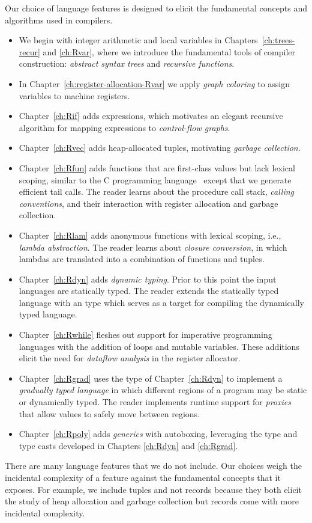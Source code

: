 \documentclass[7x10]{TimesAPriori_MIT}%
\begin{document}
Our choice of language features is designed to elicit the fundamental
concepts and algorithms used in compilers.
\begin{itemize}
\item We begin with integer arithmetic and local variables in
  Chapters~\ref{ch:trees-recur} and \ref{ch:Rvar}, where we introduce
  the fundamental tools of compiler construction: \emph{abstract
    syntax trees} and \emph{recursive functions}. 
\item In Chapter~\ref{ch:register-allocation-Rvar} we apply
  \emph{graph coloring} to assign variables to machine registers.
\item Chapter~\ref{ch:Rif} adds  expressions, which motivates
  an elegant recursive algorithm for mapping expressions to
  \emph{control-flow graphs}.
\item Chapter~\ref{ch:Rvec} adds heap-allocated tuples, motivating
  \emph{garbage collection}.
\item Chapter~\ref{ch:Rfun} adds functions that are first-class values
  but lack lexical scoping, similar to the C programming
  language~\citep{Kernighan:1988nx} except that we generate efficient
  tail calls. The reader learns about the procedure call stack,
  \emph{calling conventions}, and their interaction with register
  allocation and garbage collection.
\item Chapter~\ref{ch:Rlam} adds anonymous functions with lexical
  scoping, i.e., \emph{lambda abstraction}. The reader learns about
  \emph{closure conversion}, in which lambdas are translated into a
  combination of functions and tuples.
\item Chapter~\ref{ch:Rdyn} adds \emph{dynamic typing}. Prior to this
  point the input languages are statically typed.  The reader extends
  the statically typed language with an  type which serves
  as a target for compiling the dynamically typed language.
\item Chapter~\ref{ch:Rwhile} fleshes out support for imperative
  programming languages with the addition of loops and mutable
  variables. These additions elicit the need for \emph{dataflow
    analysis} in the register allocator.
\item Chapter~\ref{ch:Rgrad} uses the  type of
  Chapter~\ref{ch:Rdyn} to implement a \emph{gradually typed language}
  in which different regions of a program may be static or dynamically
  typed. The reader implements runtime support for \emph{proxies} that
  allow values to safely move between regions.
\item Chapter~\ref{ch:Rpoly} adds \emph{generics} with autoboxing,
  leveraging the  type and type casts developed in Chapters
  \ref{ch:Rdyn} and \ref{ch:Rgrad}.
\end{itemize}
There are many language features that we do not include. Our choices
weigh the incidental complexity of a feature against the fundamental
concepts that it exposes. For example, we include tuples and not
records because they both elicit the study of heap allocation and
garbage collection but records come with more incidental complexity.
\end{document}

